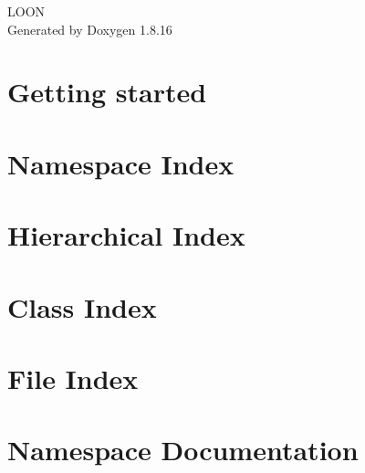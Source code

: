 \let\mypdfximage\pdfximage\def\pdfximage{\immediate\mypdfximage}\documentclass[twoside]{book}
\newcommand{\+}{\discretionary{\mbox{\scriptsize$\hookleftarrow$}}{}{}}
\newcommand{\clearemptydoublepage}{%
  \newpage{\pagestyle{empty}\cleardoublepage}%
}
\begin{document}
\hypersetup{pageanchor=false,
             bookmarksnumbered=true,
             pdfencoding=unicode
            }
\begin{titlepage}
\vspace*{7cm}
\begin{center}%
{\Large L\+O\+ON }\\
\vspace*{1cm}
{\large Generated by Doxygen 1.8.16}\\
\end{center}
\end{titlepage}
\clearemptydoublepage
{}
\tableofcontents
\clearemptydoublepage
{}
\hypersetup{pageanchor=true}

\chapter{Getting started}
\label{md__r_e_a_d_m_e}

\chapter{Namespace Index}

\chapter{Hierarchical Index}

\chapter{Class Index}

\chapter{File Index}

\chapter{Namespace Documentation}



























\end{document}
